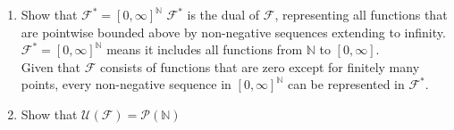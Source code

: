 \documentclass{report}
\begin{document}
{\begin{myproof}
\begin{enumerate}
\begin{itemize}
\item Pseudocomplement:\\
   The pseudocomplement of a function \(f \in \mathcal{F}\) can be considered as a function \(g \in \mathcal{F}\) such that \(f \wedge g = 0\) and \(f \vee g\) is the smallest function with this property.\\

Thus, \(\mathcal{F}\) satisfies the requirements to be a Stone lattice.
        \end{itemize}
        \item Show that \(\mathcal{F}^* = [0, \infty]^\mathbb{N}\)
\(\mathcal{F}^*\) is the dual of \(\mathcal{F}\), representing all functions that are pointwise bounded above by non-negative sequences extending to infinity.\\
\(\mathcal{F}^* = [0, \infty]^\mathbb{N}\) means it includes all functions from \(\mathbb{N}\) to \([0, \infty]\).\\
Given that \(\mathcal{F}\) consists of functions that are zero except for finitely many points, every non-negative sequence in \([0, \infty]^\mathbb{N}\) can be represented in \(\mathcal{F}^*\).
\item Show that \(\mathcal{U}(\mathcal{F}) = \mathcal{P}(\mathbb{N})\)


\end{enumerate}
\end{myproof}}
\end{document}

